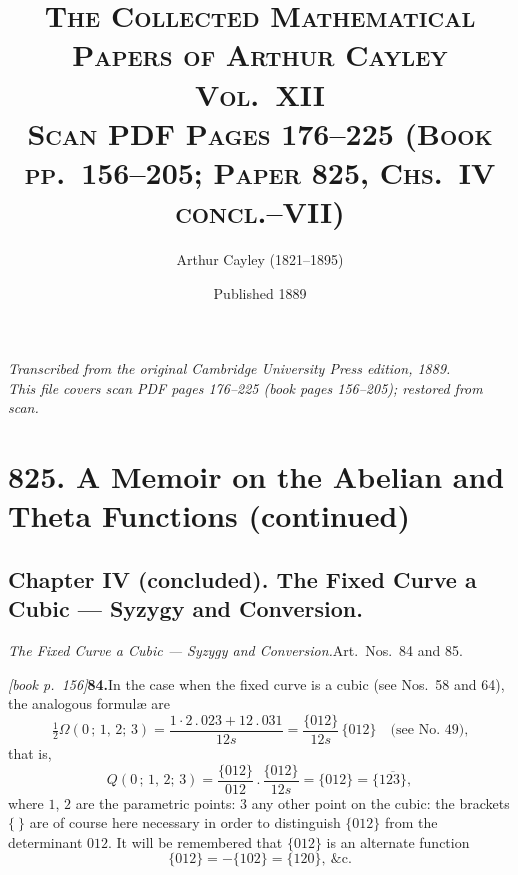 \documentclass[11pt,a4paper]{article}
\providecommand{\altf}[1]{\{#1\}}
\begin{document}
\title{\scshape The Collected Mathematical Papers of Arthur Cayley\\Vol.\ XII\\[0.5em]\large Scan PDF Pages 176--225 (Book pp.\ 156--205; Paper 825, Chs.\ IV concl.--VII)}
\author{Arthur Cayley (1821--1895)}
\date{Published 1889}
\maketitle

\thispagestyle{empty}
\begin{center}
\textit{Transcribed from the original Cambridge University Press edition, 1889.}\\
\textit{This file covers scan PDF pages 176--225 (book pages 156--205); restored from scan.}
\end{center}

\tableofcontents
\newpage

\section*{825. A Memoir on the Abelian and Theta Functions (continued)}

\subsection*{Chapter IV (concluded). The Fixed Curve a Cubic --- Syzygy and Conversion.}

\medskip\noindent\textit{The Fixed Curve a Cubic --- Syzygy and Conversion.}\quad Art.\ Nos.\ 84 and 85.

\medskip\noindent\textit{[book p.~156]}\quad \textbf{84.}\quad In the case when the fixed curve is a cubic (see Nos.\ 58 and 64), the analogous formul\ae{} are
\[
\tfrac{1}{2}\Omega(0\,;\,1,\,2;\,3) = \frac{1\cdot 2\,.\,023 + 12\,.\,031}{12s} = \frac{\altf{012}}{12s}\,\altf{012}\quad\text{(see No.\ 49),}
\]
that is,
\[
Q(0\,;\,1,\,2;\,3) = \frac{\altf{012}}{012}\,.\,\frac{\altf{012}}{\,12s\,} = \altf{012} = \altf{1\overline{23}},
\]
where $1$, $2$ are the parametric points: $3$ any other point on the cubic: the brackets $\{\ \}$ are of course here necessary in order to distinguish $\altf{012}$ from the determinant $012$. It will be remembered that $\altf{012}$ is an alternate function
\[
\altf{012} = -\altf{102} = \altf{120},\ \&\text{c.}
\]
\end{document}
